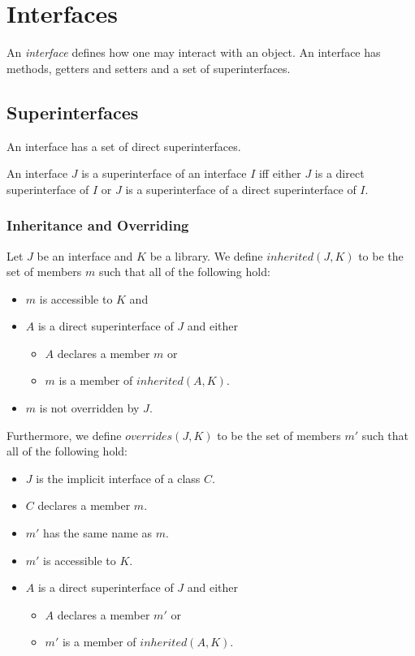 \documentclass{article}
\begin{document}
\section{Interfaces}

\LMHash{}
An {\em interface} defines how one may interact with an object.
An interface has methods, getters and setters and a set of superinterfaces.


\subsection{Superinterfaces}

\LMHash{}
An interface has a set of direct superinterfaces.

\LMHash{}
An interface $J$ is a superinterface of an interface $I$ if{}f either $J$ is a direct superinterface of $I$ or $J$ is a superinterface of a direct superinterface of $I$.


\subsubsection{Inheritance and Overriding}

\LMHash{}
Let $J$ be an interface and $K$ be a library.
We define $inherited(J, K)$ to be the set of members $m$ such that all of the following hold:
\begin{itemize}
\item $m$ is accessible to $K$ and
\item $A$ is a direct superinterface of $J$ and either
  \begin{itemize}
  \item $A$ declares a member $m$ or
  \item $m$ is a member of $inherited(A, K)$.
  \end{itemize}
\item $m$ is not overridden by $J$.
\end{itemize}

\LMHash{}
Furthermore, we define $overrides(J, K)$ to be the set of members $m'$ such that all of the following hold:
\begin{itemize}
\item $J$ is the implicit interface of a class $C$.
\item $C$ declares a member $m$.
\item $m'$ has the same name as $m$.
\item $m'$ is accessible to $K$.
\item $A$ is a direct superinterface of $J$ and either
  \begin{itemize}
  \item $A$ declares a member $m'$ or
  \item $m'$ is a member of $inherited(A, K)$.
  \end{itemize}
\end{itemize}
\end{document}

